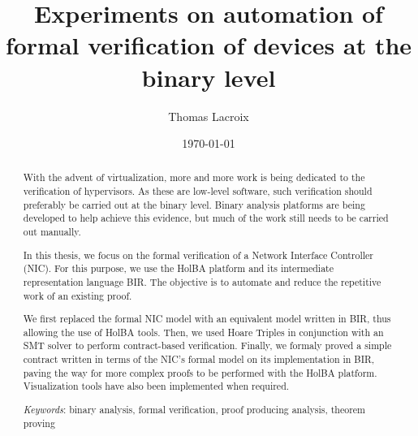 \documentclass{kththesis}
\title{Experiments on automation of formal verification of devices at the binary level}
\author{Thomas Lacroix}
\date{\today}
\begin{document}
\frontmatter %

\titlepage

\begin{abstract}
  With the advent of virtualization, more and more work is being dedicated to the verification of hypervisors. As these are low-level software, such verification should preferably be carried out at the binary level. Binary analysis platforms are being developed to help achieve this evidence, but much of the work still needs to be carried out manually.

  In this thesis, we focus on the formal verification of a Network Interface Controller (NIC). For this purpose, we use the HolBA platform and its intermediate representation language BIR. The objective is to automate and reduce the repetitive work of an existing proof.

  We first replaced the formal NIC model with an equivalent model written in BIR, thus allowing the use of HolBA tools. Then, we used Hoare Triples in conjunction with an SMT solver to perform contract-based verification. Finally, we formaly proved a simple contract written in terms of the NIC's formal model on its implementation in BIR, paving the way for more complex proofs to be performed with the HolBA platform. Visualization tools have also been implemented when required.

  \textit{Keywords}: binary analysis, formal verification, proof producing analysis, theorem proving
\end{abstract}
\end{document}
